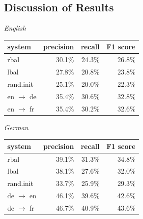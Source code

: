 \documentclass[11pt,a4paper]{article}
\def\DM#1{{\color{red}DM: \it #1}}
\def\DM#1{}
\begin{document}


\subsection{Discussion of Results}
\label{sec:results}


\begin{table}[t]
\centering
\emph{English}
\begin{tabular}{l|rrr}
system & precision & recall & F1 score \\
\hline
rbal     & 30.1\% & 24.3\%	& 26.8\% \\
lbal     & 27.8\% &	20.8\%	& 23.8\% \\
rand.init& 25.1\% &	20.0\%	&22.3\% \\
\hline
en $\rightarrow$ de & 35.4\% & 30.6\% & 32.8\% \\
en $\rightarrow$ fr & 35.4\% & 30.2\% & 32.6\% \\
\end{tabular}
\medskip

\emph{German}
\begin{tabular}{l|rrr}
system & precision & recall & F1 score \\
\hline
rbal     & 39.1\% & 31.3\% & 34.8\% \\
lbal     & 38.1\% & 27.6\% & 32.0\% \\
rand.init& 33.7\% &	25.9\% & 29.3\% \\
\hline
de $\rightarrow$ en & 46.1\% & 39.6\% & 42.6\% \\
de $\rightarrow$ fr & 46.7\% & 40.9\% & 43.6\% \\
\end{tabular}
\medskip


\end{table}
\end{document}
